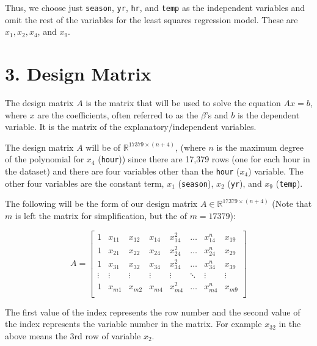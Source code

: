 \documentclass[
]{article}
\begin{document}
Thus, we choose just \texttt{season}, \texttt{yr}, \texttt{hr}, and \texttt{temp} as the independent variables and omit the rest of the variables for the least squares regression model. These are \(x_{1}, x_{2}, x_{4}\), and \(x_{9}\).

\newpage

\hypertarget{design-matrix}{%
\section{3. Design Matrix}\label{design-matrix}}

The design matrix \(A\) is the matrix that will be used to solve the equation \(Ax = b\), where \(x\) are the coefficients, often referred to as the \(\beta\)'s and \(b\) is the dependent variable. It is the matrix of the explanatory/independent variables.

The design matrix \(A\) will be of \(\mathbb{R}^{17379 \times (n+4)}\), (where \(n\) is the maximum degree of the polynomial for \(x_{4}\) (\texttt{hour})) since there are 17,379 rows (one for each hour in the dataset) and there are four variables other than the \texttt{hour} (\(x_{4}\)) variable. The other four variables are the constant term, \(x_{1}\) (\texttt{season}), \(x_{2}\) (\texttt{yr}), and \(x_{9}\) (\texttt{temp}).

The following will be the form of our design matrix
\(A \in \mathbb{R}^{17379 \times (n+4)}\) (Note that \(m\) is left the matrix for simplification, but the of \(m = 17379\)):

\[
A=
  \begin{bmatrix}
    1 & x_{11} & x_{12} & x_{14} & x_{14}^{2} & \dots & x_{14}^{n} & x_{19} \\
    1 & x_{21} & x_{22} & x_{24} & x_{24}^{2} & \dots & x_{24}^{n} & x_{29} \\
    1 & x_{31} & x_{32} & x_{34} & x_{34}^{2} & \dots & x_{34}^{n} & x_{39} \\
    \vdots & \vdots & \vdots & \vdots & \vdots & \ddots & \vdots & \vdots \\
    1 & x_{m1} & x_{m2} & x_{m4} & x_{m4}^{2} & \dots & x_{m4}^{n} & x_{m9} \\
  \end{bmatrix} 
\]

The first value of the index represents the row number and the second value of the index represents the variable number in the matrix. For example \(x_{32}\) in the above means the 3rd row of variable \(x_{2}\).
\end{document}
